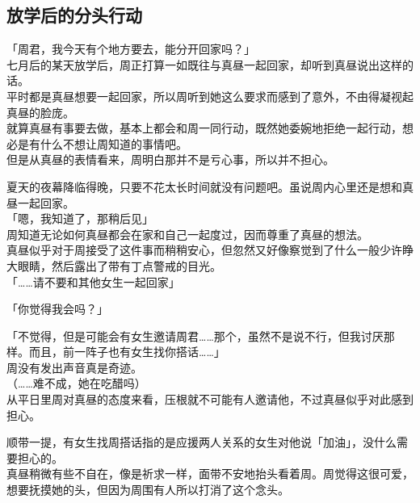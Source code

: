 \subsection{放学后的分头行动}

「周君，我今天有个地方要去，能分开回家吗？」\\

七月后的某天放学后，周正打算一如既往与真昼一起回家，却听到真昼说出这样的话。\\

平时都是真昼想要一起回家，所以周听到她这么要求而感到了意外，不由得凝视起真昼的脸庞。\\

就算真昼有事要去做，基本上都会和周一同行动，既然她委婉地拒绝一起行动，想必是有什么不想让周知道的事情吧。\\

但是从真昼的表情看来，周明白那并不是亏心事，所以并不担心。

夏天的夜幕降临得晚，只要不花太长时间就没有问题吧。虽说周内心里还是想和真昼一起回家。\\

「嗯，我知道了，那稍后见」\\

周知道无论如何真昼都会在家和自己一起度过，因而尊重了真昼的想法。\\

真昼似乎对于周接受了这件事而稍稍安心，但忽然又好像察觉到了什么一般少许睁大眼睛，然后露出了带有丁点警戒的目光。\\

「……请不要和其他女生一起回家」

「你觉得我会吗？」

「不觉得，但是可能会有女生邀请周君……那个，虽然不是说不行，但我讨厌那样。而且，前一阵子也有女生找你搭话……」\\

周没有发出声音真是奇迹。\\

（……难不成，她在吃醋吗）\\

从平日里周对真昼的态度来看，压根就不可能有人邀请他，不过真昼似乎对此感到担心。

顺带一提，有女生找周搭话指的是应援两人关系的女生对他说「加油」，没什么需要担心的。\\

真昼稍微有些不自在，像是祈求一样，面带不安地抬头看着周。周觉得这很可爱，想要抚摸她的头，但因为周围有人所以打消了这个念头。\\

